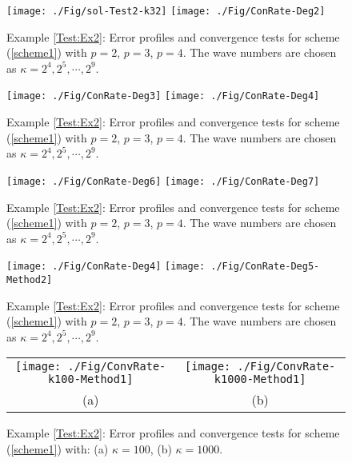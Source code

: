\documentclass[preprint,11pt]{elsarticle}
\begin{document}
\begin{figure}[H]
\centering
\texttt{[image: ./Fig/sol-Test2-k32]}
\texttt{[image: ./Fig/ConRate-Deg2]}
\caption{Example \ref{Test:Ex2}: Error profiles and convergence tests for scheme (\ref{scheme1}) with $p = 2$, $p = 3$, $p=4$. The wave numbers are chosen as $\kappa = 2^4,2^5,\cdots,2^9$.}\label{Fig:Ex2-1}
\end{figure}



\begin{figure}[H]
\centering
\texttt{[image: ./Fig/ConRate-Deg3]}
\texttt{[image: ./Fig/ConRate-Deg4]}
\caption{Example \ref{Test:Ex2}: Error profiles and convergence tests for scheme (\ref{scheme1}) with $p = 2$, $p = 3$, $p=4$. The wave numbers are chosen as $\kappa = 2^4,2^5,\cdots,2^9$.}\label{Fig:Ex2-2}
\end{figure}

\begin{figure}[H]
\centering
\texttt{[image: ./Fig/ConRate-Deg6]}
\texttt{[image: ./Fig/ConRate-Deg7]}
\caption{Example \ref{Test:Ex2}: Error profiles and convergence tests for scheme (\ref{scheme1}) with $p = 2$, $p = 3$, $p=4$. The wave numbers are chosen as $\kappa = 2^4,2^5,\cdots,2^9$.}\label{Fig:Ex2-3}
\end{figure}


\begin{figure}[H]
\centering
\texttt{[image: ./Fig/ConRate-Deg4]}
\texttt{[image: ./Fig/ConRate-Deg5-Method2]}
\caption{Example \ref{Test:Ex2}: Error profiles and convergence tests for scheme (\ref{scheme1}) with $p = 2$, $p = 3$, $p=4$. The wave numbers are chosen as $\kappa = 2^4,2^5,\cdots,2^9$.}\label{Fig:Ex2-}
\end{figure}


\begin{figure}[H]
\centering
\begin{tabular}{cc}
\texttt{[image: ./Fig/ConvRate-k100-Method1]}
&
\texttt{[image: ./Fig/ConvRate-k1000-Method1]}\\
(a) & (b)
\end{tabular}
\caption{Example \ref{Test:Ex2}: Error profiles and convergence tests for scheme (\ref{scheme1}) with: (a) $\kappa = 100$, (b) $\kappa = 1000$.}\label{Fig:Ex2-3}
\end{figure}
\end{document}
